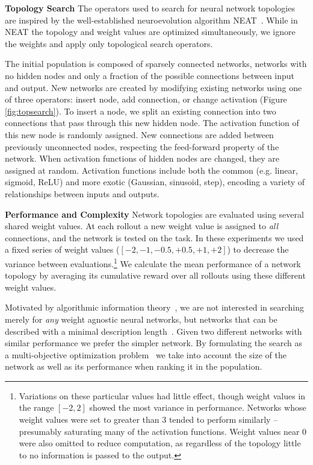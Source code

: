 
\textbf{Topology Search}\: 
The operators used to search for neural network topologies are inspired by the well-established neuroevolution algorithm NEAT~\cite{neat}. 
%
While in NEAT the topology and weight values are optimized simultaneously, we ignore the weights and apply only topological search operators.
%

The initial population is composed of sparsely connected networks, networks with no hidden nodes and only a fraction of the possible connections between input and output. 
%
New networks are created by modifying existing networks using one of three operators: insert node, add connection, or change activation (Figure \ref{fig:topsearch}). 
%
To insert a node, we split an existing connection into two connections that pass through this new hidden node.
%
The activation function of this new node is randomly assigned. 
%
New connections are added between previously unconnected nodes, respecting the feed-forward property of the network. 
%
When activation functions of hidden nodes are changed, they are assigned at random.
%
Activation functions include both the common (e.g. linear, sigmoid, ReLU) and more exotic (Gaussian, sinusoid, step), encoding a variety of relationships between inputs and outputs. 




\textbf{Performance and Complexity}\: 
Network topologies are evaluated using several shared weight values. 
%
At each rollout a new weight value is assigned to \textit{all} connections, and the network is tested on the task. 
%
In these experiments we used a fixed series of weight values ($[-2,-1,-0.5,+0.5,+1,+2]$) to decrease the variance between evaluations.\footnote{Variations on these particular values had little effect, though weight values in the range $[-2,2]$ showed the most variance in performance. Networks whose weight values were set to greater than 3 tended to perform similarly -- presumably saturating many of the activation functions. 
%
Weight values near 0 were also omitted to reduce computation, as regardless of the topology little to no information is passed to the output.}
%
We calculate the mean performance of a network topology by averaging its cumulative reward over all rollouts using these different weight values.
%

%
Motivated by algorithmic information theory~\cite{solomonoff1964formal}, we are not interested in searching merely for \textit{any} weight agnostic neural networks, but networks that can be described with a minimal description length~\cite{rissanen1978modeling,grunwald2007minimum,rissanen2007information}. 
%
Given two different networks with similar performance we prefer the simpler network. 
%
By formulating the search as a multi-objective optimization problem~\cite{konak2006multi,mouret2011novelty} we take into account the size of the network as well as its performance when ranking it in the population.

